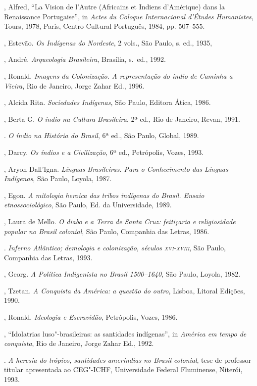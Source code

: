 \begin{bibliohedra}
, Alfred, ``La Vision de l'Autre (Africains et Indiens
d'Amérique) dans la Renaissance Portugaise'', in \textit{Actes du
Coloque Internacional d'Études Humanistes}, Tours, 1978, Paris, Centro
Cultural Português, 1984, pp. 507--555. 

, Estevão. \textit{Os Indígenas do Nordeste}, 2 vols.,
São Paulo, s. ed., 1935,

, André. \textit{Arqueologia Brasileira}, Brasília, s.~ed., 1992.

, Ronald. \textit{Imagens da Colonização. A representação do
índio de Caminha a Vieira}, Rio de Janeiro, Jorge Zahar Ed.,
1996. 

, Alcida Rita. \textit{Sociedades Indígenas}, São Paulo, Editora
Ática, 1986.

, Berta G. \textit{O índio na Cultura Brasileira}, 2ª ed., Rio
de Janeiro, Revan, 1991.

\titidem. \textit{O índio na História do Brasil}, 6ª ed., São
Paulo, Global, 1989.

, Darcy. \textit{Os índios e a Civilização}, 6ª ed.,
Petrópolis, Vozes, 1993.

, Aryon Dall'Igna. \textit{Línguas Brasileiras. Para o
Conhecimento das Línguas Indígenas}, São Paulo, Loyola, 1987.

, Egon. \textit{A mitologia heroica das tribos indígenas do
Brasil. Ensaio etnossociológico}, São Paulo, Ed. da Universidade, 1989.

, Laura de Mello. \textit{O diabo e a Terra de Santa Cruz:
feitiçaria e religiosidade popular no Brasil colonial}, São Paulo,
Companhia das Letras, 1986.

\titidem. \textit{Inferno Atlântico; demologia e
colonização, séculos \textsc{xvi}-\textsc{xviii}}, São Paulo, Companhia das Letras, 1993.

, Georg. \textit{A Política Indigenista no Brasil 1500--1640}, 
São Paulo, Loyola, 1982.

, Tzetan. \textit{A Conquista da América: a questão do outro}, 
Lisboa, Litoral Edições, 1990.

, Ronald. \textit{Ideologia e Escravidão}, Petrópolis, Vozes,
1986.

\titidem, ``Idolatrias luso"-brasileiras: as santidades
indígenas'', in \textit{América em tempo de conquista}, Rio de Janeiro,
Jorge Zahar Ed., 1992.

\titidem. \textit{A heresia do trópico, santidades ameríndias
no Brasil colonial}, tese de professor titular apresentada ao CEG"-ICHF,
Universidade Federal Fluminense, Niterói, 1993.
\end{bibliohedra}
 



